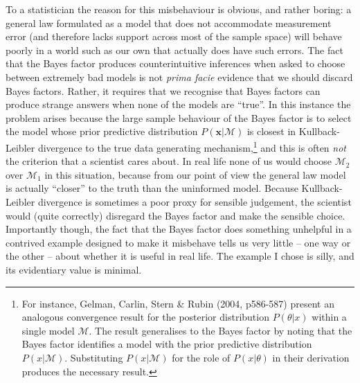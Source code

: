 \documentclass[doc]{apa6}
\let\rmarkdownfootnote\footnote%
\def\footnote{\protect\rmarkdownfootnote}
\theoremstyle{definition}
\theoremstyle{definition}
\theoremstyle{definition}
\theoremstyle{remark}
\begin{document}
To a statistician the reason for this misbehaviour is obvious, and
rather boring: a general law formulated as a model that does not
accommodate measurement error (and therefore lacks support across most
of the sample space) will behave poorly in a world such as our own that
actually does have such errors. The fact that the Bayes factor produces
counterintuitive inferences when asked to choose between extremely bad
models is not \emph{prima facie} evidence that we should discard Bayes
factors. Rather, it requires that we recognise that Bayes factors can
produce strange answers when none of the models are \enquote{true}. In
this instance the problem arises because the large sample behaviour of
the Bayes factor is to select the model whose prior predictive
distribution \(P(\bm{x}|\mathcal{M})\) is closest in Kullback-Leibler
divergence to the true data generating mechanism,\footnote{For instance,
  Gelman, Carlin, Stern \& Rubin (2004, p586-587) present an analogous
  convergence result for the posterior distribution \(P(\theta|x)\)
  within a single model \(\mathcal{M}\). The result generalises to the
  Bayes factor by noting that the Bayes factor identifies a model with
  the prior predictive distribution \(P(x | \mathcal{M})\). Substituting
  \(P(x | \mathcal{M})\) for the role of \(P(x | \theta)\) in their
  derivation produces the necessary result.} and this is often
\emph{not} the criterion that a scientist cares about. In real life none
of us would choose \(\mathcal{M}_2\) over \(\mathcal{M}_1\) in this
situation, because from our point of view the general law model is
actually \enquote{closer} to the truth than the uninformed model.
Because Kullback-Leibler divergence is sometimes a poor proxy for
sensible judgement, the scientist would (quite correctly) disregard the
Bayes factor and make the sensible choice. Importantly though, the fact
that the Bayes factor does something unhelpful in a contrived example
designed to make it misbehave tells us very little -- one way or the
other -- about whether it is useful in real life. The example I chose is
silly, and its evidentiary value is minimal.
\end{document}
